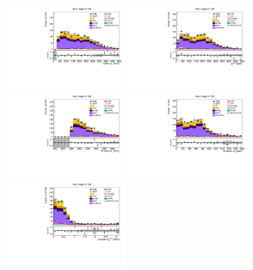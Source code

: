 \begin{figure}[tbp]
  \begin{center}
    \includegraphics[width=0.48\textwidth]{figures/wlnhbb2016/boosted/WenWHHeavyFlavorFJCR_lepton1Pt.pdf}
    \includegraphics[width=0.48\textwidth]{figures/wlnhbb2016/boosted/WenWHHeavyFlavorFJCR_pfmet.pdf}
    \includegraphics[width=0.48\textwidth]{figures/wlnhbb2016/boosted/WenWHHeavyFlavorFJCR_topWBosonPt.pdf}
    \includegraphics[width=0.48\textwidth]{figures/wlnhbb2016/boosted/WenWHHeavyFlavorFJCR_mT.pdf}
    \includegraphics[width=0.48\textwidth]{figures/wlnhbb2016/boosted/WenWHHeavyFlavorFJCR_deltaPhiLep1Met.pdf}

\end{center}
\end{figure}
